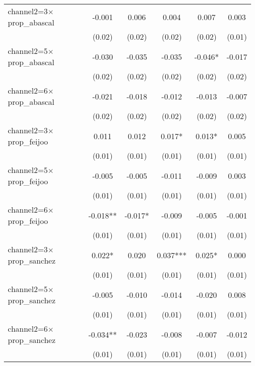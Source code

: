 \begin{tabular}{l*{5}{c}}
channel2=3$\times$prop\_abascal&      -0.001   &       0.006   &       0.004   &       0.007   &       0.003   \\
                    &      (0.02)   &      (0.02)   &      (0.02)   &      (0.02)   &      (0.01)   \\
channel2=5$\times$prop\_abascal&      -0.030   &      -0.035   &      -0.035   &      -0.046*  &      -0.017   \\
                    &      (0.02)   &      (0.02)   &      (0.02)   &      (0.02)   &      (0.02)   \\
channel2=6$\times$prop\_abascal&      -0.021   &      -0.018   &      -0.012   &      -0.013   &      -0.007   \\
                    &      (0.02)   &      (0.02)   &      (0.02)   &      (0.02)   &      (0.02)   \\
channel2=3$\times$prop\_feijoo&       0.011   &       0.012   &       0.017*  &       0.013*  &       0.005   \\
                    &      (0.01)   &      (0.01)   &      (0.01)   &      (0.01)   &      (0.01)   \\
channel2=5$\times$prop\_feijoo&      -0.005   &      -0.005   &      -0.011   &      -0.009   &       0.003   \\
                    &      (0.01)   &      (0.01)   &      (0.01)   &      (0.01)   &      (0.01)   \\
channel2=6$\times$prop\_feijoo&      -0.018** &      -0.017*  &      -0.009   &      -0.005   &      -0.001   \\
                    &      (0.01)   &      (0.01)   &      (0.01)   &      (0.01)   &      (0.01)   \\
channel2=3$\times$prop\_sanchez&       0.022*  &       0.020   &       0.037***&       0.025*  &       0.000   \\
                    &      (0.01)   &      (0.01)   &      (0.01)   &      (0.01)   &      (0.01)   \\
channel2=5$\times$prop\_sanchez&      -0.005   &      -0.010   &      -0.014   &      -0.020   &       0.008   \\
                    &      (0.01)   &      (0.01)   &      (0.01)   &      (0.01)   &      (0.01)   \\
channel2=6$\times$prop\_sanchez&      -0.034** &      -0.023   &      -0.008   &      -0.007   &      -0.012   \\
                    &      (0.01)   &      (0.01)   &      (0.01)   &      (0.01)   &      (0.01)   \\

\end{tabular}
